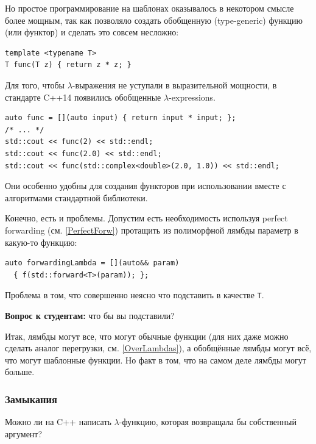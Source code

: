 \documentclass[a4paper,12pt,oneside]{article}
\newif\ifanswers
\begin{document}
Но простое программирование на шаблонах оказывалось в некотором смысле более мощным, так как позволяло создать обобщенную (type-generic) функцию (или функтор) и сделать это совсем несложно:

\begin{lstlisting}
template <typename T>
T func(T z) { return z * z; }
\end{lstlisting}

Для того, чтобы $\lambda$-выражения не уступали в выразительной мощности, в стандарте C++14 появились обобщенные $\lambda$-expressions.

\begin{lstlisting}
auto func = [](auto input) { return input * input; };
/* ... */
std::cout << func(2) << std::endl;
std::cout << func(2.0) << std::endl;
std::cout << func(std::complex<double>(2.0, 1.0)) << std::endl;
\end{lstlisting}

Они особенно удобны для создания функторов при использовании вместе с алгоритмами стандартной библиотеки.

Конечно, есть и проблемы. Допустим есть необходимость используя perfect forwarding (см. \ref{PerfectForw}) протащить из полиморфной лямбды параметр в какую-то функцию:

\begin{lstlisting}
auto forwardingLambda = [](auto&& param) 
  { f(std::forward<T>(param)); };
\end{lstlisting}

Проблема в том, что совершенно неясно что подставить в качестве \lstinline!T!.

\textbf{Вопрос к студентам:} что бы вы подставили?

\ifanswers
Правильный ответ: \lstinline!decltype(param)!. Этот ответ основан на механике \lstinline!std::forward! как условного перемещения. Если \lstinline!T! подходит для выбора, то и \lstinline!T&&! тоже подходит.
\fi

Итак, лямбды могут все, что могут обычные функции (для них даже можно сделать аналог перегрузки, см. \ref{OverLambdas}), а обобщённые лямбды могут всё, что могут шаблонные функции. Но факт в том, что на самом деле лямбды могут больше.

\subsubsection{Замыкания}\label{Closures}

Можно ли на C++ написать $\lambda$-функцию, которая возвращала бы собственный аргумент? 
\end{document}
